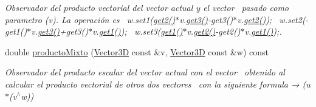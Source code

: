 \begin{Indent}
\begin{DoxyCompactItemize}
\begin{DoxyCompactList}\small\item\em Observador del producto vectorial del vector actual y el vector~\newline
 pasado como parametro (v). La operación es~\newline
 w.\+set1(\mbox{\hyperlink{classed_1_1Vector3D_acb66f2ac0cb4f24592698fb317458e35}{get2()}}$\ast$v.\mbox{\hyperlink{classed_1_1Vector3D_a50c08e3089bc1b0cd5de77d8f0086cc0}{get3()}}-\/get3()$\ast$v.\mbox{\hyperlink{classed_1_1Vector3D_acb66f2ac0cb4f24592698fb317458e35}{get2()}});~\newline
 w.\+set2(-\/get1()$\ast$v.\mbox{\hyperlink{classed_1_1Vector3D_a50c08e3089bc1b0cd5de77d8f0086cc0}{get3()}}+get3()$\ast$v.\mbox{\hyperlink{classed_1_1Vector3D_ac96497e7c082fde19b4998408e4ec36b}{get1()}});~\newline
 w.\+set3(\mbox{\hyperlink{classed_1_1Vector3D_ac96497e7c082fde19b4998408e4ec36b}{get1()}}$\ast$v.\mbox{\hyperlink{classed_1_1Vector3D_acb66f2ac0cb4f24592698fb317458e35}{get2()}}-\/get2()$\ast$v.\mbox{\hyperlink{classed_1_1Vector3D_ac96497e7c082fde19b4998408e4ec36b}{get1()}});. \end{DoxyCompactList}\item 
double \mbox{\hyperlink{classed_1_1Vector3D_a2063f0cdfdb6a34e4f426a1f247a4459}{producto\+Mixto}} (\mbox{\hyperlink{classed_1_1Vector3D}{Vector3D}} const \&v, \mbox{\hyperlink{classed_1_1Vector3D}{Vector3D}} const \&w) const
\begin{DoxyCompactList}\small\item\em Observador del producto escalar del vector actual con el vector~\newline
 obtenido al calcular el producto vectorial de otros dos vectores~\newline
 con la siguiente formula → (u$\ast$(v$^\wedge$w)) \end{DoxyCompactList}\end{DoxyCompactItemize}
\end{Indent}
